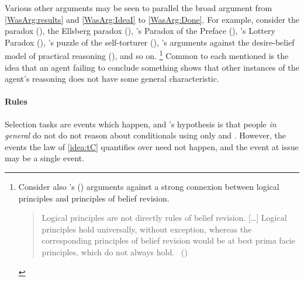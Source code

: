 \begin{note}
  Various other arguments may be seen to parallel the broad argument from \ref{WasArg:results} and \ref{WasArg:IdeaI} to \ref{WasArg:Done}.
  For example, consider the \citeauthor{Allais:1979aa} paradox (\cite{Allais:1979aa}),
  the Ellsberg paradox (\cite{Ellsberg:1961aa}), \citeauthor{Makinson:1965aa}'s Paradox of the Preface (\citeyear{Makinson:1965aa}), \citeauthor{Kyburg:1997aa}'s Lottery Paradox (\citeyear{Kyburg:1997aa}), \citeauthor{Quinn:1990aa}'s  puzzle of the self-torturer (\citeyear{Quinn:1990aa}), \citeauthor{Bratman:1981aa}'s arguments against the desire-belief model of practical reasoning (\citeyear{Bratman:1981aa,Bratman:1987aa}), and so on.%
  \footnote{
    Consider also \citeauthor{Harman:1984aa}'s (\citeyear{Harman:1984aa,Harman:1986ux}) arguments against a strong connexion between logical principles and principles of belief revision.

    \begin{quote}
      Logical principles are not directly rules of belief revision.
      [\dots]
      Logical principles hold universally, without exception, whereas the corresponding principles of belief revision would be at best prima facie principles, which do not always hold.%
      \mbox{ }\hfill\mbox{(\citeyear[107--108]{Harman:1984aa})}
    \end{quote}
  }
  Common to each mentioned is the idea that an agent failing to conclude something shows that other instances of the agent's reasoning does not have some general characteristic.
\end{note}


\paragraph*{Rules}

\begin{note}
  Selection tasks are events which happen, and \citeauthor{Wason:1966aa}'s hypothesis is that people \emph{in general} do not do not reason about conditionals using only  and .
  However, the events the law of \autoref{idea:tC} quantifies over need not happen, and the event at issue may be a single event.
\end{note}

